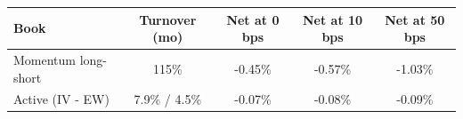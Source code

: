 \begin{tabular}{lcccc}
\toprule
Book & Turnover (mo) & Net at 0 bps & Net at 10 bps & Net at 50 bps \\
\midrule
Momentum long-short & 115\% & -0.45\% & -0.57\% & -1.03\% \\
Active (IV - EW) & 7.9\% / 4.5\% & -0.07\% & -0.08\% & -0.09\% \\
\bottomrule
\end{tabular}
